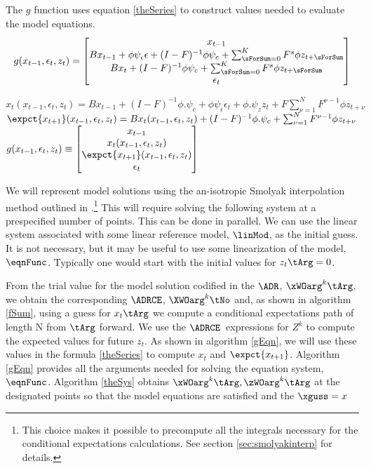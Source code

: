 \documentclass[12pt]{article}
\begin{document}
The $g$ function uses equation \ref{theSeries} to construct values needed to evaluate the model equations.
\begin{gather}
  g(x_{t-1},\epsilon_t,z_t)=
  \begin{bmatrix}
    x_{t-1}\\
B x_{t-1}+ \phi \psi_\epsilon\epsilon + (I - F)^{-1} \phi \psi_c + \sum_{\sForSum=0}^K F^s \phi z_{t+\sForSum} \\
B x_{t}+   (I - F)^{-1} \phi \psi_c + \sum_{\sForSum=0}^K F^s \phi z_{t+\sForSum} \\
\epsilon_t
  \end{bmatrix}
\end{gather}
\begin{algorithm}
$x_t(x_{t-1},\epsilon_t,z_t)=B x_{t-1} + (I-F)^{-1} \phi. \psi_c+\phi \psi_\epsilon \epsilon_t + \phi . \psi_z z_t + F\sum_{\nu=1}^N F^{\nu-1} \phi z_{t+\nu} $\;
$\expct{x_{t+1}}(x_{t-1},\epsilon_t,z_t)=B x_{t}(x_{t-1},\epsilon_t,z_t) + (I-F)^{-1} \phi. \psi_c + \sum_{\nu=1}^N F^{\nu-1} \phi z_{t+\nu} $\;
$g(x_{t-1},\epsilon_t,z_t)\equiv
\begin{bmatrix}
  x_{t-1}\\x_t(x_{t-1},\epsilon_t,z_t)\\\expct{x_{t+1}}(x_{t-1},\epsilon_t,z_t)\\ \epsilon_t
\end{bmatrix}
$\;
\caption{$\modArgs(\linMod,\sum_{\nu=1}^N F^{\nu-1} \phi z_{t+\nu})$}
\label{gEqn}
\end{algorithm}

We will represent model solutions using the an-isotropic Smolyak interpolation method outlined in \cite{Judd2014}.\footnote{ This choice makes it possible to precompute all the integrals necessary for the conditional expectations calculations. See section \ref{sec:smolyakinterp} for details.}  This will require solving
the following system at a prespecified number of points.  This can be done in parallel. We can use the linear system associated with some 
linear reference model, $\linMod$, as the initial guess.  
It is not necessary, but it may be useful to use some linearization of the model, $\eqnFunc$.  Typically one would start with the initial values for $z_t\tArg=0$.

From the  trial value for the model solution codified in the $\ADR$, $\xWOarg^k\tArg$, we obtain the corresponding $\ADRCE$, $\XWOarg^k\tNo$ and, as
 shown in algorithm \ref{fSum}, using
a guess for $x_t\tArg$ we compute a conditional expectations path of length N from $\tArg$ forward.  We use the $\ADRCE$\ expressions for $Z^k$ to compute the expected values for future $z_t$. As shown in algorithm \ref{gEqn}, we 
will use these values in the formula \ref{theSeries} to compute $x_t$ and $\expct{x_{t+1}}$. Algorithm \ref{gEqn} provides all the arguments needed for solving the equation system, $\eqnFunc$.  Algorithm \ref{theSys} obtains  $\xWOarg^k\tArg,\zWOarg^k\tArg$ at the designated points so that the model equations are satisfied and the $\xguss=x$
\end{document}
